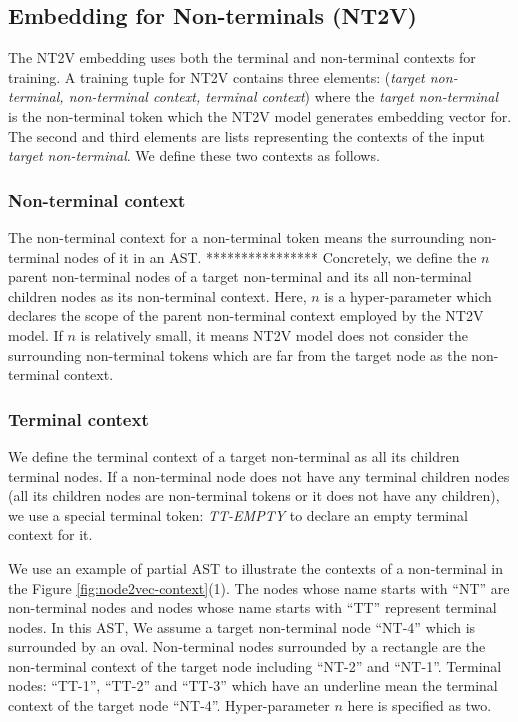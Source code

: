 \documentclass[E]{compsoft}
\begin{document}



\subsection{Embedding for Non-terminals (NT2V)}
\label{sub:embedding_nt}
The NT2V embedding uses both the terminal and non-terminal contexts for training.
A training tuple for NT2V contains three elements: (\textit{target non-terminal, non-terminal context, terminal context}) where the \textit{target non-terminal} is the non-terminal token which the NT2V model generates embedding vector for. 
The second and third elements are lists representing the contexts of the input \textit{target non-terminal}.
We define these two contexts as follows.

\subsubsection{Non-terminal context}
The non-terminal context for a non-terminal token means the surrounding non-terminal nodes of it in an AST. ****************
Concretely, we define the $n$ parent non-terminal nodes of a target non-terminal and its all non-terminal children nodes as its non-terminal context.
Here, $n$ is a hyper-parameter which declares the scope of the parent non-terminal context employed by the NT2V model. 
If $n$ is relatively small, it means NT2V model does not consider the surrounding non-terminal tokens which are far from the target node as the non-terminal context.

\subsubsection{Terminal context} 
We define the terminal context of a target non-terminal as all its children terminal nodes. 
If a non-terminal node does not have any terminal children nodes (all its children nodes are non-terminal tokens or it does not have any children), we use a special terminal token: \textit{TT-EMPTY} to declare an empty terminal context for it.

We use an example of partial AST to illustrate the contexts of a non-terminal in the Figure \ref{fig:node2vec-context}(1). The nodes whose name starts with ``NT'' are non-terminal nodes and nodes whose name starts with ``TT'' represent terminal nodes. 
In this AST, We assume a target non-terminal node ``NT-4'' which is surrounded by an oval. 
Non-terminal nodes surrounded by a rectangle are the non-terminal context of the target node including ``NT-2'' and ``NT-1''. 
Terminal nodes: ``TT-1'', ``TT-2'' and ``TT-3'' which have an underline mean the terminal context of the target node ``NT-4''. 
Hyper-parameter $n$ here is specified as two.
\end{document}
